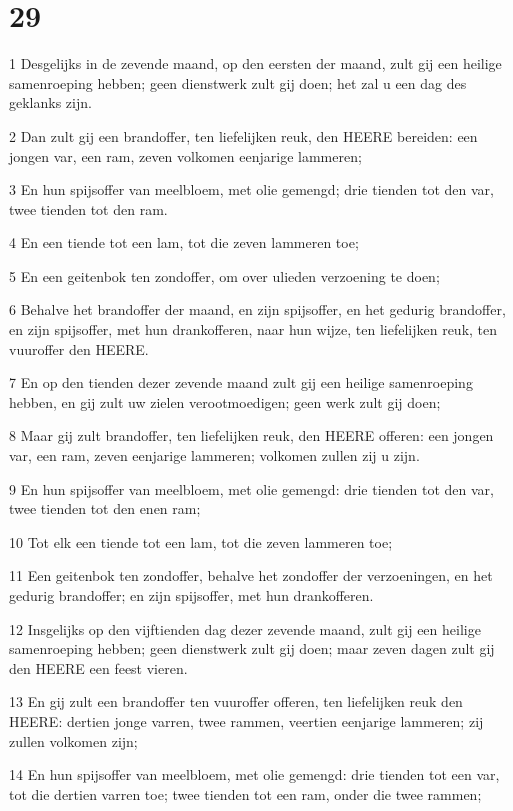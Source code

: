 \chapter{29}

\par 1 Desgelijks in de zevende maand, op den eersten der maand, zult gij een heilige samenroeping hebben; geen dienstwerk zult gij doen; het zal u een dag des geklanks zijn.
\par 2 Dan zult gij een brandoffer, ten liefelijken reuk, den HEERE bereiden: een jongen var, een ram, zeven volkomen eenjarige lammeren;
\par 3 En hun spijsoffer van meelbloem, met olie gemengd; drie tienden tot den var, twee tienden tot den ram.
\par 4 En een tiende tot een lam, tot die zeven lammeren toe;
\par 5 En een geitenbok ten zondoffer, om over ulieden verzoening te doen;
\par 6 Behalve het brandoffer der maand, en zijn spijsoffer, en het gedurig brandoffer, en zijn spijsoffer, met hun drankofferen, naar hun wijze, ten liefelijken reuk, ten vuuroffer den HEERE.
\par 7 En op den tienden dezer zevende maand zult gij een heilige samenroeping hebben, en gij zult uw zielen verootmoedigen; geen werk zult gij doen;
\par 8 Maar gij zult brandoffer, ten liefelijken reuk, den HEERE offeren: een jongen var, een ram, zeven eenjarige lammeren; volkomen zullen zij u zijn.
\par 9 En hun spijsoffer van meelbloem, met olie gemengd: drie tienden tot den var, twee tienden tot den enen ram;
\par 10 Tot elk een tiende tot een lam, tot die zeven lammeren toe;
\par 11 Een geitenbok ten zondoffer, behalve het zondoffer der verzoeningen, en het gedurig brandoffer; en zijn spijsoffer, met hun drankofferen.
\par 12 Insgelijks op den vijftienden dag dezer zevende maand, zult gij een heilige samenroeping hebben; geen dienstwerk zult gij doen; maar zeven dagen zult gij den HEERE een feest vieren.
\par 13 En gij zult een brandoffer ten vuuroffer offeren, ten liefelijken reuk den HEERE: dertien jonge varren, twee rammen, veertien eenjarige lammeren; zij zullen volkomen zijn;
\par 14 En hun spijsoffer van meelbloem, met olie gemengd: drie tienden tot een var, tot die dertien varren toe; twee tienden tot een ram, onder die twee rammen;
